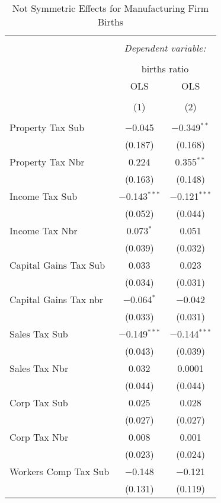 
\begin{table}[!htbp] \centering 
  \caption{Not Symmetric Effects for  Manufacturing Firm Births} 
  \label{31-33noequality} 
\begin{tabular}{@{\extracolsep{5pt}}lcc} 
\\[-1.8ex]\hline 
\hline \\[-1.8ex] 
 & \multicolumn{2}{c}{\textit{Dependent variable:}} \\ 
\cline{2-3} 
\\[-1.8ex] & \multicolumn{2}{c}{births ratio} \\ 
 & OLS & OLS \\ 
\\[-1.8ex] & (1) & (2)\\ 
\hline \\[-1.8ex] 
 Property Tax Sub & $-$0.045 & $-$0.349$^{**}$ \\ 
  & (0.187) & (0.168) \\ 
  Property Tax Nbr & 0.224 & 0.355$^{**}$ \\ 
  & (0.163) & (0.148) \\ 
  Income Tax Sub & $-$0.143$^{***}$ & $-$0.121$^{***}$ \\ 
  & (0.052) & (0.044) \\ 
  Income Tax Nbr & 0.073$^{*}$ & 0.051 \\ 
  & (0.039) & (0.032) \\ 
  Capital Gains Tax Sub & 0.033 & 0.023 \\ 
  & (0.034) & (0.031) \\ 
  Capital Gains Tax nbr & $-$0.064$^{*}$ & $-$0.042 \\ 
  & (0.033) & (0.031) \\ 
  Sales Tax Sub & $-$0.149$^{***}$ & $-$0.144$^{***}$ \\ 
  & (0.043) & (0.039) \\ 
  Sales Tax Nbr & 0.032 & 0.0001 \\ 
  & (0.044) & (0.044) \\ 
  Corp Tax Sub & 0.025 & 0.028 \\ 
  & (0.027) & (0.027) \\ 
  Corp Tax Nbr & 0.008 & 0.001 \\ 
  & (0.023) & (0.024) \\ 
  Workers Comp Tax Sub & $-$0.148 & $-$0.121 \\ 
  & (0.131) & (0.119) \\ 

\end{tabular}
\end{table}

